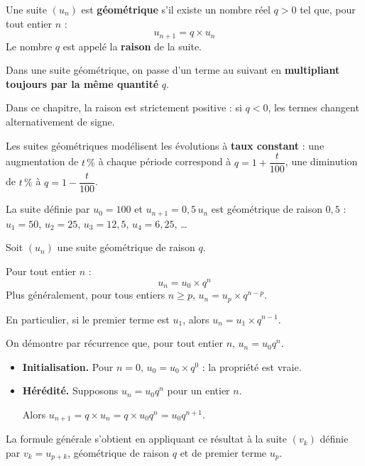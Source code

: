 \documentclass{poly}
\begin{document}
\begin{defin}
	Une suite $(u_n)$ est \textbf{géométrique} s'il existe un nombre réel $q > 0$ tel que, pour tout entier $n$ :
	\[
		u_{n+1} = q \times u_n
	\]
	Le nombre $q$ est appelé la \textbf{raison} de la suite.
\end{defin}

\begin{rem}
	Dans une suite géométrique, on passe d'un terme au suivant en \textbf{multipliant toujours par la même quantité} $q$.

	Dans ce chapitre, la raison est strictement positive : si $q < 0$, les termes changent alternativement de signe.

	Les suites géométriques modélisent les évolutions à \textbf{taux constant} : une augmentation de $t\,\%$ à chaque période correspond à $q = 1 + \dfrac{t}{100}$, une diminution de $t\,\%$ à $q = 1 - \dfrac{t}{100}$.
\end{rem}

\begin{ex}
	La suite définie par $u_0 = 100$ et $u_{n+1} = 0{,}5\,u_n$ est géométrique de raison $0{,}5$ : $u_1 = 50$, $u_2 = 25$, $u_3 = 12{,}5$, $u_4 = 6{,}25$, \dots
\end{ex}

\begin{propriete}
	Soit $(u_n)$ une suite géométrique de raison $q$.

	Pour tout entier $n$ :
	\[
		u_n = u_0 \times q^n
	\]
	Plus généralement, pour tous entiers $n \geq p$, $u_n = u_p \times q^{n-p}$.

	En particulier, si le premier terme est $u_1$, alors $u_n = u_1 \times q^{n-1}$.
\end{propriete}

\begin{demonstration}
	On démontre par récurrence que, pour tout entier $n$, $u_n = u_0 q^n$.
	\begin{itemize}
		\item \textbf{Initialisation.} Pour $n = 0$, $u_0 = u_0 \times q^0$ : la propriété est vraie.
		\item \textbf{Hérédité.} Supposons $u_n = u_0 q^n$ pour un entier $n$.

		      Alors $u_{n+1} = q \times u_n = q \times u_0 q^n = u_0 q^{n+1}$.
	\end{itemize}
	La formule générale s'obtient en appliquant ce résultat à la suite $(v_k)$ définie par $v_k = u_{p+k}$, géométrique de raison $q$ et de premier terme $u_p$.
\end{demonstration}
\end{document}
